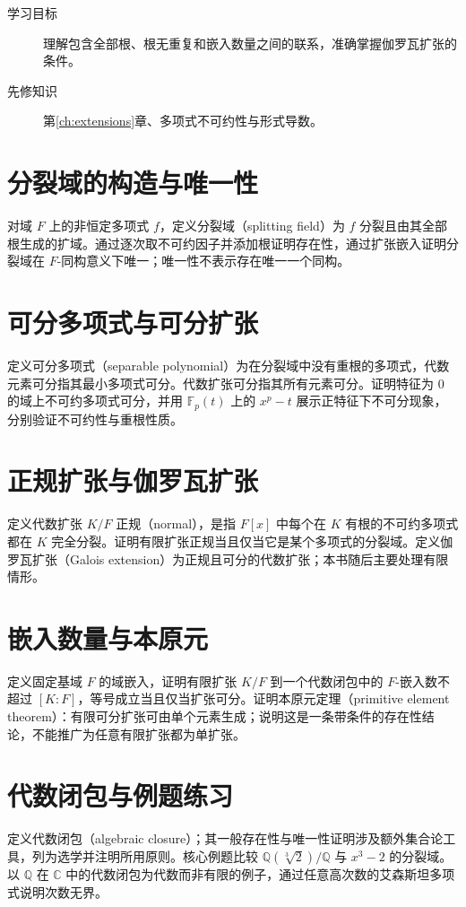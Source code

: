 \documentclass[UTF8,12pt,a4paper,fontset=fandol]{ctexbook}
\begin{document}
\begin{description}
  \item[学习目标] 理解包含全部根、根无重复和嵌入数量之间的联系，准确掌握伽罗瓦扩张的条件。
  \item[先修知识] 第\ref{ch:extensions}章、多项式不可约性与形式导数。
\end{description}

\section{分裂域的构造与唯一性}
对域 $F$ 上的非恒定多项式 $f$，定义分裂域（splitting field）为 $f$ 分裂且由其全部根生成的扩域。通过逐次取不可约因子并添加根证明存在性，通过扩张嵌入证明分裂域在 $F$-同构意义下唯一；唯一性不表示存在唯一一个同构。

\section{可分多项式与可分扩张}
定义可分多项式（separable polynomial）为在分裂域中没有重根的多项式，代数元素可分指其最小多项式可分。代数扩张可分指其所有元素可分。证明特征为 $0$ 的域上不可约多项式可分，并用 $\mathbb F_p(t)$ 上的 $x^p-t$ 展示正特征下不可分现象，分别验证不可约性与重根性质。

\section{正规扩张与伽罗瓦扩张}
定义代数扩张 $K/F$ 正规（normal），是指 $F[x]$ 中每个在 $K$ 有根的不可约多项式都在 $K$ 完全分裂。证明有限扩张正规当且仅当它是某个多项式的分裂域。定义伽罗瓦扩张（Galois extension）为正规且可分的代数扩张；本书随后主要处理有限情形。

\section{嵌入数量与本原元}
定义固定基域 $F$ 的域嵌入，证明有限扩张 $K/F$ 到一个代数闭包中的 $F$-嵌入数不超过 $[K:F]$，等号成立当且仅当扩张可分。证明本原元定理（primitive element theorem）：有限可分扩张可由单个元素生成；说明这是一条带条件的存在性结论，不能推广为任意有限扩张都为单扩张。

\section{代数闭包与例题练习}
定义代数闭包（algebraic closure）；其一般存在性与唯一性证明涉及额外集合论工具，列为选学并注明所用原则。核心例题比较 $\mathbb Q(\sqrt[3]{2})/\mathbb Q$ 与 $x^3-2$ 的分裂域。以 $\mathbb Q$ 在 $\mathbb C$ 中的代数闭包为代数而非有限的例子，通过任意高次数的艾森斯坦多项式说明次数无界。
\end{document}
